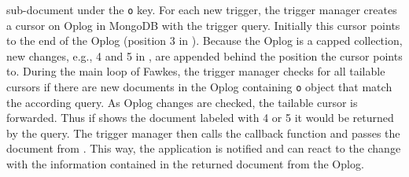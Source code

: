 sub-document under the \texttt{o} key. For each new trigger, the
trigger manager creates a cursor on Oplog in MongoDB with the trigger
query. Initially this cursor points to the end of the Oplog (position
3 in ). Because the Oplog is a capped
collection, new changes, e.g., 4 and 5 in ,
are appended behind the position the cursor points to. During the main
loop of Fawkes, the trigger manager checks for all tailable cursors if
there are new documents in the Oplog containing \texttt{o} object that match the according
query. As Oplog changes are checked, the tailable cursor is forwarded. Thus if
 shows the document labeled with 4 or 5 it would be
returned by the query.
The trigger manager then calls the callback function and passes the
document from . This way, the application is
notified and can react to the change with the information contained in
the returned document from the Oplog.

